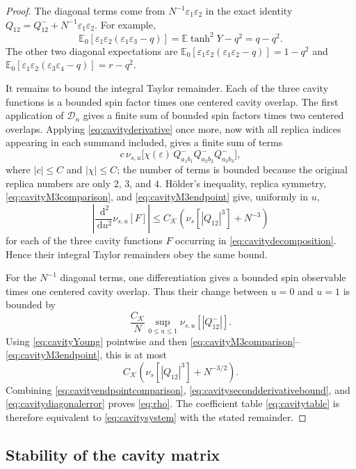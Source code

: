 \documentclass[11pt]{article}
\numberwithin{equation}{section}
\newcommand{\E}{\mathbb{E}}
\newcommand{\1}{\mathbf 1}
\newcommand{\cK}{\mathcal K}
\newcommand{\dd}{\,\mathrm d}
\begin{document}
\begin{proof}
The diagonal terms come from
$N^{-1}\varepsilon_1\varepsilon_2$ in the exact identity
$Q_{12}=Q^-_{12}+N^{-1}\varepsilon_1\varepsilon_2$.  For example,
\[
 \E_0[\varepsilon_1\varepsilon_2
       (\varepsilon_1\varepsilon_3-q)]
 =\E\tanh^2Y-q^2=q-q^2.
\]
The other two diagonal expectations are
$\E_0[\varepsilon_1\varepsilon_2
(\varepsilon_1\varepsilon_2-q)]=1-q^2$ and
$\E_0[\varepsilon_1\varepsilon_2
(\varepsilon_3\varepsilon_4-q)]=r-q^2$.

It remains to bound the integral Taylor remainder.  Each of the three
cavity functions is a bounded spin factor times one centered cavity
overlap.  The first application of $\mathcal D_n$ gives a finite sum
of bounded spin factors times two centered overlaps.  Applying
\eqref{eq:cavityderivative} once more, now with all replica indices
appearing in each summand included, gives a finite sum of terms
\[
 c\,\nu_{s,u}\bigl[
 \chi(\varepsilon)\,Q^-_{a_1b_1}Q^-_{a_2b_2}Q^-_{a_3b_3}\bigr],
\]
where $|c|\le C$ and $|\chi|\le C$; the number of terms is bounded
because the original replica numbers are only $2$, $3$, and $4$.
H\"older's inequality,
replica symmetry, \eqref{eq:cavityM3comparison}, and
\eqref{eq:cavityM3endpoint} give, uniformly in $u$,
\begin{equation}
 \left|\frac{\dd^2}{\dd u^2}\nu_{s,u}[F]\right|
 \le C_{\cK}\left(\nu_s[|Q_{12}|^3]+N^{-3}\right)
 \label{eq:cavitysecondderivativebound}
\end{equation}
for each of the three cavity functions $F$ occurring in
\eqref{eq:cavitydecomposition}.  Hence their integral Taylor remainders obey
the same bound.

For the $N^{-1}$ diagonal terms, one differentiation gives a bounded
spin observable times one centered cavity overlap.  Thus their change
between $u=0$ and $u=1$ is bounded by
\[
 \frac{C_{\cK}}N\sup_{0\le u\le1}\nu_{s,u}[|Q^-_{12}|].
\]
Using \eqref{eq:cavityYoung} pointwise and then
\eqref{eq:cavityM3comparison}--\eqref{eq:cavityM3endpoint}, this is at
most
\begin{equation}
 C_{\cK}\left(\nu_s[|Q_{12}|^3]+N^{-3/2}\right).
 \label{eq:cavitydiagonalerror}
\end{equation}
Combining \eqref{eq:cavityendpointcomparison},
\eqref{eq:cavitysecondderivativebound}, and
\eqref{eq:cavitydiagonalerror} proves \eqref{eq:rho}.  The coefficient
table \eqref{eq:cavitytable} is therefore equivalent to
\eqref{eq:cavitysystem} with the stated remainder.
\end{proof}

\subsection{Stability of the cavity matrix}\label{subsec:stability}
\end{document}
